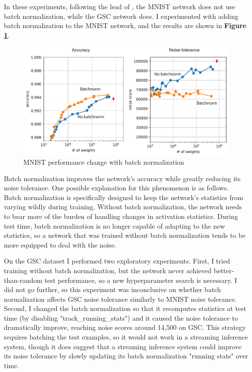 \documentclass[11pt]{article}
\begin{document}
In these experiments, following the lead of \citep{ahmad2019dense},  the MNIST network does not use batch normalization, while the GSC network does. I experimented with adding batch normalization to the MNIST network, and the results are shown in \textbf{Figure \ref{fig:mnist-batchnorm}}.

\begin{figure}[htbp]
\centering
\includegraphics[width=5in]{./figures/mnist-batchnorm.pdf}
\caption{MNIST performance change with batch normalization \label{fig:mnist-batchnorm}}
\end{figure}

Batch normalization improves the network's accuracy while greatly reducing its noise tolerance. One possible explanation for this phenomenon is as follows. Batch normalization is specifically designed to keep the network's statistics from varying wildly during training. Without batch normalization, the network needs to bear more of the burden of handling changes in activation statistics. During test time, batch normalization is no longer capable of adapting to the new statistics, so a network that was trained without batch normalization tends to be more equipped to deal with the noise.

On the GSC dataset I performed two exploratory experiments. First, I tried training without batch normalization, but the network never achieved better-than-random test performance, so a new hyperparameter search is necessary. I did not go further, so this experiment was inconclusive on whether batch normalization affects GSC noise tolerance similarly to MNIST noise tolerance. Second, I changed the batch normalization so that it recomputes statistics at test time (by disabling "track\_running\_stats") and it caused the noise tolerance to dramatically improve, reaching noise scores around 14,500 on GSC. This strategy requires batching the test examples, so it would not work in a streaming inference system, though it does suggest that a streaming inference system could improve its noise tolerance by slowly updating its batch normalization "running stats" over time.
\end{document}
